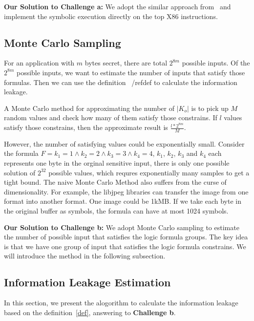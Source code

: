 \vspace*{6pt}
\textbf{Our Solution to Challenge a:}
We adopt the similar approach from~\cite{217563} and implement the symbolic execution 
directly on the top X86 instructions.

\subsection{Monte Carlo Sampling}
\label{MCreasons}
For an application with $m$ bytes secret, there are total $2^{8m}$ possible inputs. Of the
$2^{8m}$ possible inputs, we want to estimate the number of inputs that satisfy those formulas.
Then we can use the definition ~/ref{def} to calculate the information leakage.

A Monte Carlo method for approximating the number of $|K_o|$ is to pick up 
$M$ random values and check how many of them satisfy those constrains. If $l$ values
satisfy those constrains, then the approximate result is $\frac{l*2^{8m}}{M}$.

However, the number of satisfying values could be exponentially small. Consider the formula
$F={k_1} = 1\land{k_2} = 2\land{k_3} = 3\land{k_4} = 4$, $k_1$, $k_2$, $k_3$ and $k_4$ each represents
one byte in the orginal sensitive input, there is only one possible solution of $2^{32}$ possible
values, which requres exponentially many samples to get a tight bound. 
The naive Monte Carlo Method also suffers from the curse of dimensionality. For example, 
the libjpeg libraries can transfer the image from one format into another format. One image could
be 1kMB. If we take each byte in the original buffer as symbols, the formula can have at most
1024 symbols. 

\vspace*{6pt}
\textbf{Our Solution to Challenge b:}
We adopt Monte Carlo sampling to estimate the number of possible input
that satisfies the logic formula groups. The key idea is that we have one group of input that satisfies
the logic formula constrains.  We will
introduce the method in the following subsection.


\subsection{Information Leakage Estimation}

\newcommand{\addr}[1]{{l}_{#1}}
\renewcommand{\addr}[1]{{\gamma}_{#1}}
\renewcommand{\addr}[1]{{\zeta}_{#1}}
\renewcommand{\addr}[1]{{\xi}_{#1}}

In this section, we present the alogorithm to calculate the information
leakage based on the definition~\ref{def}, answering to
\textbf{Challenge b}. 

